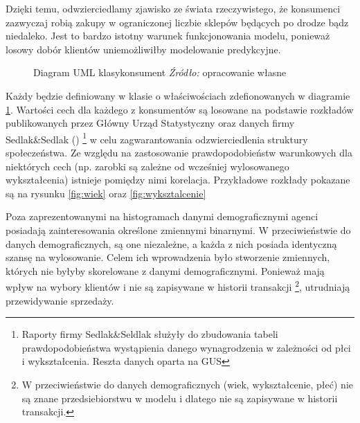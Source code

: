 \documentclass[polish, twoside, 12pt, a4paper]{article}
\theoremstyle{definition}
\theoremstyle{plain}
\theoremstyle{remark}
\begin{document}
Dzięki temu, odwzierciedlamy zjawisko ze świata rzeczywistego, że konsumenci zazwyczaj robią zakupy w ograniczonej liczbie sklepów będących po drodze bądz niedaleko. Jest to bardzo istotny warunek funkcjonowania modelu, ponieważ losowy dobór klientów uniemożliwiłby modelowanie predykcyjne.


\begin{figure}[hbt]
  \centering
{}
  \captionsetup{margin=10pt,font=small,labelfont=bf,width=.8\textwidth}
  \caption[Diagram UML klasy konsument]{Diagram UML klasykonsument \textit{Źródło:} opracowanie własne}\label{UML:konsument}
\end{figure}

Każdy będzie definiowany w klasie o właściwościach zdefionowanych w diagramie \ref{UML:konsument}. Wartości cech dla każdego z konsumentów są losowane na podstawie rozkładów publikowanych przez Główny Urząd Statystyczny \cite{GUS2011} oraz danych firmy Sedlak\&Sedlak (\cite{Sedlak2013}) \footnote{Raporty firmy Sedlak\&Seldlak służyły do zbudowania tabeli prawdopodobieństwa wystąpienia danego wynagrodzenia w zależności od płci i wykształcenia. Reszta danych oparta na GUS} w celu zagwarantowania odzwierciedlenia struktury społeczeństwa. Ze względu na zastosowanie prawdopodobieństw warunkowych dla niektórych cech (np. zarobki są zależne od wcześniej wylosowanego wykształcenia) istnieje pomiędzy nimi korelacja. Przykładowe rozkłady pokazane są na rysunku \ref{fig:wiek} oraz \ref{fig:wyksztalcenie}

Poza zaprezentowanymi na histogramach danymi demograficznymi agenci posiadają zainteresowania określone zmiennymi binarnymi. W przeciwieństwie do danych demograficznych, są one niezależne, a każda z nich posiada identyczną szansę na wylosowanie. Celem ich wprowadzenia było stworzenie zmiennych, których nie byłyby skorelowane z danymi demograficznymi. Ponieważ mają wpływ na wybory klientów i nie są zapisywane w historii transakcji \footnote{W przeciwieństwie do danych demograficznych (wiek, wykształcenie, płeć) nie są znane przedsiebiorstwu w modelu i dlatego nie są zapisywane w historii transakcji.}, utrudniają przewidywanie sprzedaży.
\end{document}
